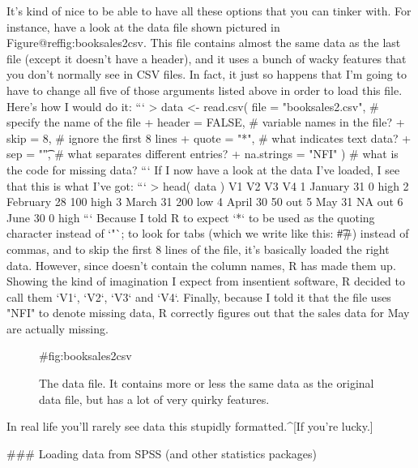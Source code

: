 It's kind of nice to be able to have all these options that you can tinker with. For instance, have a look at the data file shown pictured in Figure@reffig:booksales2csv. This file contains almost the same data as the last file (except it doesn't have a header), and it uses a bunch of wacky features that you don't normally see in CSV files. In fact, it just so happens that I'm going to have to change all five of those arguments listed above in order to load this file. Here's how I would do it:
```
> data <- read.csv( file = "booksales2.csv",  # specify the name of the file
+                   header = FALSE,           # variable names in the file?
+                   skip = 8,                 # ignore the first 8 lines
+                   quote = "*",              # what indicates text data?
+                   sep = "\t",               # what separates different entries?
+                   na.strings = "NFI" )      # what is the code for missing data?
``` 
If I now have a look at the data I've loaded, I see that this is what I've got:
```
> head( data )
         V1 V2  V3   V4
1   January 31   0 high
2 February  28 100 high
3    March  31 200  low
4    April  30  50  out
5     May   31  NA  out
6     June  30   0 high
```
Because I told R to expect `*` to be used as the quoting character instead of `"`; to look for tabs (which we write like this: \rtextverb#\t#) instead of commas, and to skip the first 8 lines of the file, it's basically loaded the right data. However, since  doesn't contain the column names, R has made them up. Showing the kind of imagination I expect from insentient software, R decided to call them `V1`, `V2`, `V3` and `V4`. Finally, because I told it that the file uses "NFI" to denote missing data, R correctly figures out that the sales data for May are actually missing. 

\begin{figure}[t]
\begin{center}
\caption{The  data file. It contains more or less the same data as the original  data file, but has a lot of very quirky features.}
{#fig:booksales2csv}
\HR
\end{center}
\end{figure} 

In real life you'll rarely see data this stupidly formatted.^[If you're lucky.] 

### Loading data from SPSS (and other statistics packages)

